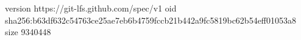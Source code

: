 version https://git-lfs.github.com/spec/v1
oid sha256:b63df632c54763ce25ae7eb6b4759fccb21b442a9fc5819bc62b54eff01053a8
size 9340448
